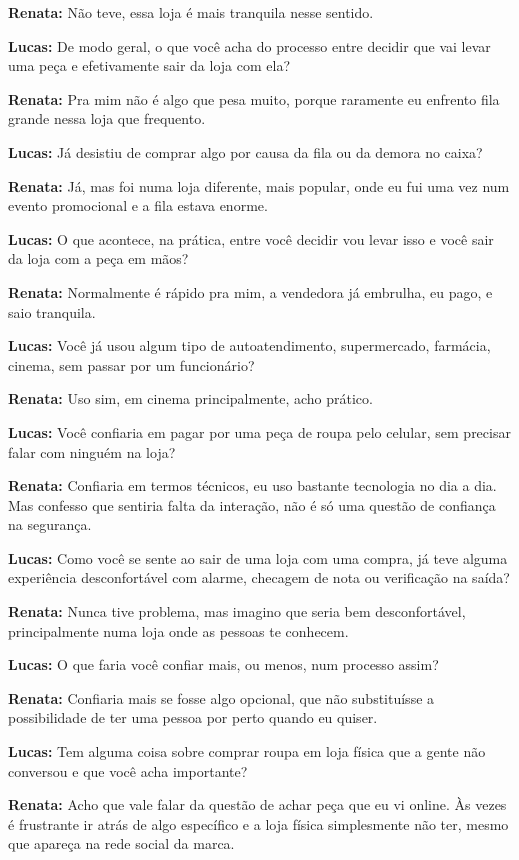 \textbf{Renata:} Não teve, essa loja é mais tranquila nesse sentido.

\textbf{Lucas:} De modo geral, o que você acha do processo entre decidir que vai levar uma peça e efetivamente sair da loja com ela?

\textbf{Renata:} Pra mim não é algo que pesa muito, porque raramente eu enfrento fila grande nessa loja que frequento.

\textbf{Lucas:} Já desistiu de comprar algo por causa da fila ou da demora no caixa?

\textbf{Renata:} Já, mas foi numa loja diferente, mais popular, onde eu fui uma vez num evento promocional e a fila estava enorme.

\textbf{Lucas:} O que acontece, na prática, entre você decidir vou levar isso e você sair da loja com a peça em mãos?

\textbf{Renata:} Normalmente é rápido pra mim, a vendedora já embrulha, eu pago, e saio tranquila.

\textbf{Lucas:} Você já usou algum tipo de autoatendimento, supermercado, farmácia, cinema, sem passar por um funcionário?

\textbf{Renata:} Uso sim, em cinema principalmente, acho prático.

\textbf{Lucas:} Você confiaria em pagar por uma peça de roupa pelo celular, sem precisar falar com ninguém na loja?

\textbf{Renata:} Confiaria em termos técnicos, eu uso bastante tecnologia no dia a dia. Mas confesso que sentiria falta da interação, não é só uma questão de confiança na segurança.

\textbf{Lucas:} Como você se sente ao sair de uma loja com uma compra, já teve alguma experiência desconfortável com alarme, checagem de nota ou verificação na saída?

\textbf{Renata:} Nunca tive problema, mas imagino que seria bem desconfortável, principalmente numa loja onde as pessoas te conhecem.

\textbf{Lucas:} O que faria você confiar mais, ou menos, num processo assim?

\textbf{Renata:} Confiaria mais se fosse algo opcional, que não substituísse a possibilidade de ter uma pessoa por perto quando eu quiser.

\textbf{Lucas:} Tem alguma coisa sobre comprar roupa em loja física que a gente não conversou e que você acha importante?

\textbf{Renata:} Acho que vale falar da questão de achar peça que eu vi online. Às vezes é frustrante ir atrás de algo específico e a loja física simplesmente não ter, mesmo que apareça na rede social da marca.

